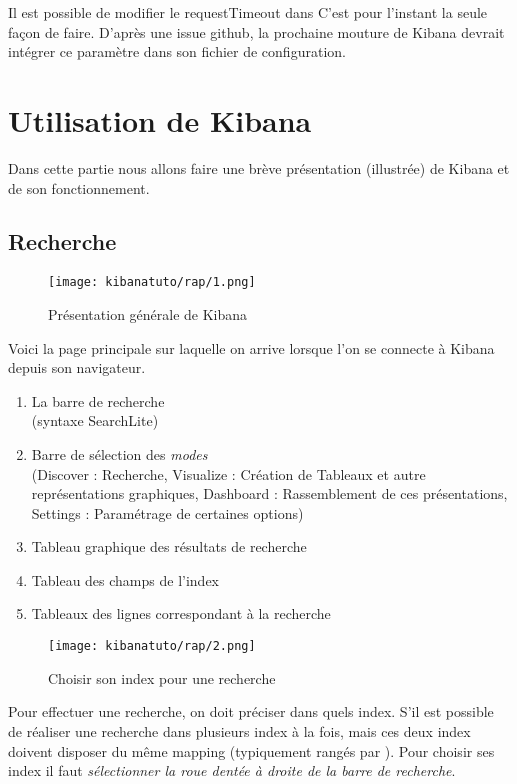 Il est possible de modifier le requestTimeout dans 
C'est pour l'instant la seule façon de faire. D'après une issue github, la prochaine 
mouture de Kibana devrait intégrer ce paramètre dans son fichier de configuration.

\section{Utilisation de Kibana}
Dans cette partie nous allons faire une brève présentation (illustrée) de Kibana et
de son fonctionnement.

\subsection{Recherche}
\begin{figure}[H]
\center
\texttt{[image: kibanatuto/rap/1.png]}
\label{fig:kibanatuto1}
\caption{Présentation générale de Kibana}
\end{figure}

Voici la page principale sur laquelle on arrive lorsque l'on se connecte à Kibana
depuis son navigateur.

\begin{enumerate}
    \item La barre de recherche \\(syntaxe SearchLite)
    \item Barre de sélection des \emph{modes} \\(Discover : Recherche, Visualize : Création 
    de Tableaux et autre représentations graphiques, Dashboard : Rassemblement de
    ces présentations, Settings : Paramétrage de certaines options)
    \item Tableau graphique des résultats de recherche
    \item Tableau des champs de l'index
    \item Tableaux des lignes correspondant à la recherche
\end{enumerate}


\begin{figure}[H]
\center
\texttt{[image: kibanatuto/rap/2.png]}
\label{fig:kibanatuto2}
\caption{Choisir son index pour une recherche}
\end{figure}
Pour effectuer une recherche, on doit préciser dans quels index. S'il est possible 
de réaliser une recherche dans plusieurs index à la fois,  mais ces deux index doivent 
disposer du même mapping (typiquement rangés par ).
Pour choisir ses index il faut \emph{sélectionner la roue dentée à droite de la barre
de recherche}.


